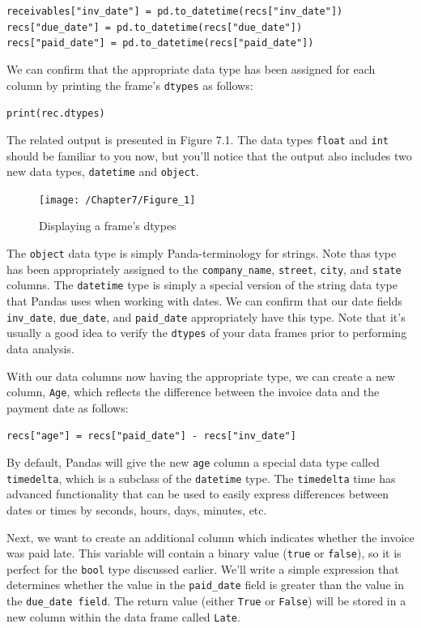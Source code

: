 \documentclass{book}
\begin{document}
\texttt{receivables["inv\_date"] = pd.to\_datetime(recs["inv\_date"]) \\
recs["due\_date"] = pd.to\_datetime(recs["due\_date"]) \\
recs["paid\_date"] = pd.to\_datetime(recs["paid\_date"])}

We can confirm that the appropriate data type has been assigned for each column by printing the frame's \texttt{dtypes} as follows:

\texttt{print(rec.dtypes)}

The related output is presented in Figure 7.1. The data types \texttt{float} and \texttt{int} should be familiar to you now, but you'll notice that the output also includes two new data types, \texttt{datetime} and \texttt{object}.

\begin{figure}[h]
	\caption{Displaying a frame's dtypes}
	\centering\texttt{[image: /Chapter7/Figure\_1]}
\end{figure}

The \texttt{object} data type is simply Panda-terminology for strings. Note thas type has been appropriately assigned to the \texttt{company\_name}, \texttt{street}, \texttt{city}, and \texttt{state} columns. The \texttt{datetime} type is simply a special version of the string data type that Pandas uses when working with dates. We can confirm that our date fields \texttt{inv\_date}, \texttt{due\_date}, and \texttt{paid\_date} appropriately have this type. Note that it's usually a good idea to verify the \texttt{dtypes} of your data frames prior to performing data analysis.

With our data columns now having the appropriate type, we can create a new column, \texttt{Age}, which reflects the difference between the invoice data and the payment date as follows:

\texttt{recs["age"] = recs["paid\_date"] - recs["inv\_date"]}

By default, Pandas will give the new \texttt{age} column a special data type called \texttt{timedelta}, which is a subclass of the \texttt{datetime} type. The \texttt{timedelta} time has advanced functionality that can be used to easily express differences between dates or times by seconds, hours, days, minutes, etc.

Next, we want to create an additional column which indicates whether the invoice was paid late. This variable will contain a binary value (\texttt{true} or \texttt{false}), so it is perfect for the \texttt{bool} type discussed earlier. We'll write a simple expression that determines whether the value in the \texttt{paid\_date} field is greater than the value in the \texttt{due\_date field}. The return value (either \texttt{True} or \texttt{False}) will be stored in a new column within the data frame called \texttt{Late}.
\end{document}
